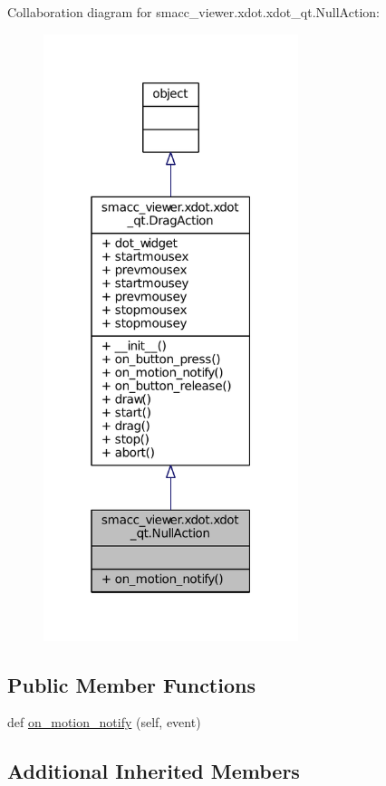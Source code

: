 Collaboration diagram for smacc\+\_\+viewer.\+xdot.\+xdot\+\_\+qt.\+Null\+Action\+:
\nopagebreak
\begin{figure}[H]
\begin{center}
\leavevmode
\includegraphics[width=211pt]{classsmacc__viewer_1_1xdot_1_1xdot__qt_1_1NullAction__coll__graph}
\end{center}
\end{figure}
\subsection*{Public Member Functions}
\begin{DoxyCompactItemize}
\item 
def \hyperlink{classsmacc__viewer_1_1xdot_1_1xdot__qt_1_1NullAction_ac3c941c0798f90631d76549010e2c1e0}{on\+\_\+motion\+\_\+notify} (self, event)
\end{DoxyCompactItemize}
\subsection*{Additional Inherited Members}


